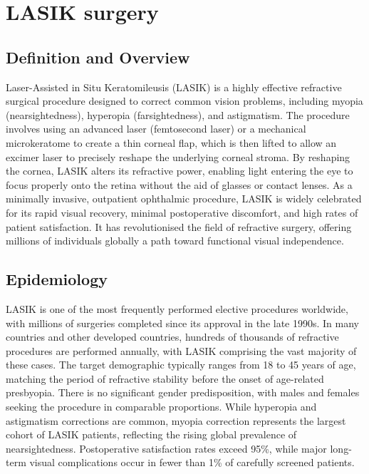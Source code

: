 \chapter{LASIK surgery}

\section*{Definition and Overview}
Laser-Assisted in Situ Keratomileusis (LASIK) is a highly effective refractive surgical procedure designed to correct common vision problems, including myopia (nearsightedness), hyperopia (farsightedness), and astigmatism. The procedure involves using an advanced laser (femtosecond laser) or a mechanical microkeratome to create a thin corneal flap, which is then lifted to allow an excimer laser to precisely reshape the underlying corneal stroma. By reshaping the cornea, LASIK alters its refractive power, enabling light entering the eye to focus properly onto the retina without the aid of glasses or contact lenses. As a minimally invasive, outpatient ophthalmic procedure, LASIK is widely celebrated for its rapid visual recovery, minimal postoperative discomfort, and high rates of patient satisfaction. It has revolutionised the field of refractive surgery, offering millions of individuals globally a path toward functional visual independence.

\section*{Epidemiology}
LASIK is one of the most frequently performed elective procedures worldwide, with millions of surgeries completed since its approval in the late 1990s. In many countries and other developed countries, hundreds of thousands of refractive procedures are performed annually, with LASIK comprising the vast majority of these cases. The target demographic typically ranges from 18 to 45 years of age, matching the period of refractive stability before the onset of age-related presbyopia. There is no significant gender predisposition, with males and females seeking the procedure in comparable proportions. While hyperopia and astigmatism corrections are common, myopia correction represents the largest cohort of LASIK patients, reflecting the rising global prevalence of nearsightedness. Postoperative satisfaction rates exceed 95\%, while major long-term visual complications occur in fewer than 1\% of carefully screened patients.

